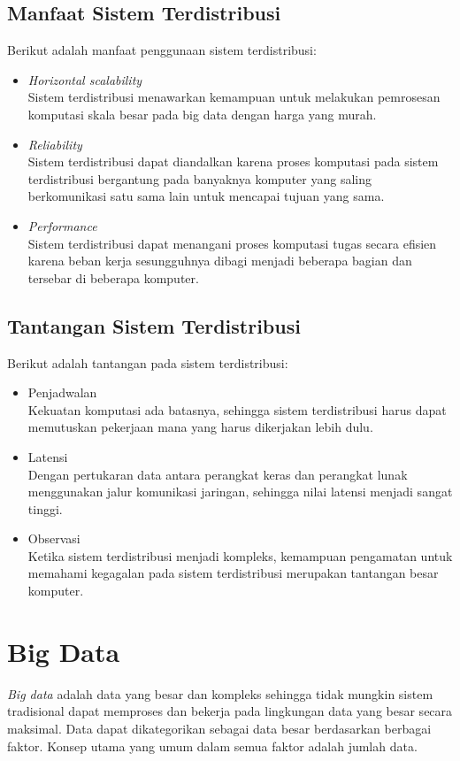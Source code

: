\subsection{Manfaat Sistem Terdistribusi}
\noindent Berikut adalah manfaat penggunaan sistem terdistribusi:

\begin{itemize}
\item \textit{Horizontal scalability}\\
Sistem terdistribusi menawarkan kemampuan untuk melakukan pemrosesan komputasi skala besar pada big data dengan harga yang murah.

\item \textit{Reliability}\\
Sistem terdistribusi dapat diandalkan karena proses komputasi pada sistem terdistribusi bergantung pada banyaknya komputer yang saling berkomunikasi satu sama lain untuk mencapai tujuan yang sama.
 
\item \textit{Performance}\\
Sistem terdistribusi dapat menangani proses komputasi tugas secara efisien karena beban kerja sesungguhnya dibagi menjadi beberapa bagian dan tersebar di beberapa komputer. 
\end{itemize}

\subsection{Tantangan Sistem Terdistribusi} 
\noindent Berikut adalah tantangan pada sistem terdistribusi:

\begin{itemize}
\item Penjadwalan\\
Kekuatan komputasi ada batasnya, sehingga sistem terdistribusi harus dapat memutuskan pekerjaan mana yang harus dikerjakan lebih dulu.
\item Latensi\\
Dengan pertukaran data antara perangkat keras dan perangkat lunak menggunakan jalur komunikasi jaringan, sehingga nilai latensi menjadi sangat tinggi. 
\item Observasi\\
Ketika sistem terdistribusi menjadi kompleks, kemampuan pengamatan untuk memahami kegagalan pada sistem terdistribusi merupakan tantangan besar komputer. 
\end{itemize}

\section{Big Data}
\textit{Big data} adalah data yang besar dan kompleks sehingga tidak mungkin sistem tradisional dapat memproses dan bekerja pada lingkungan data yang besar secara maksimal. Data dapat dikategorikan sebagai data besar berdasarkan berbagai faktor. Konsep utama yang umum dalam semua faktor  adalah jumlah data. \\

